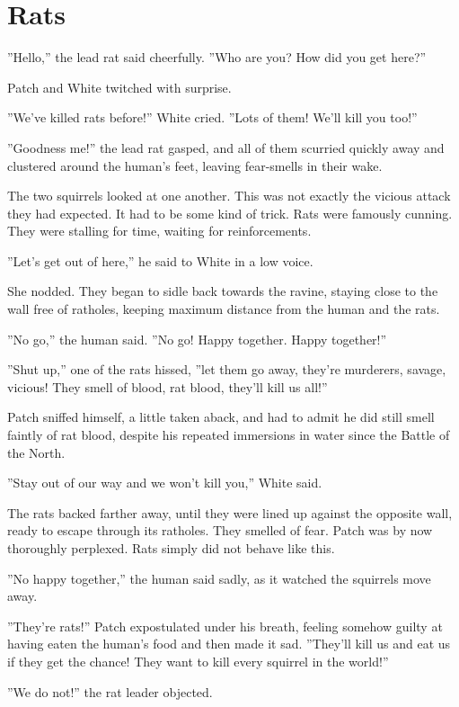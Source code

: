 \documentclass[12pt]{book}
\begin{document}

\section{Rats}

''Hello,'' the lead rat said cheerfully. ''Who are you? How did you get here?''

Patch and White twitched with surprise.

''We've killed rats before!'' White cried. ''Lots of them! We'll kill you too!''

''Goodness me!'' the lead rat gasped, and all of them scurried quickly away and clustered around the human's feet, leaving fear-smells in their wake.

The two squirrels looked at one another. This was not exactly the vicious attack they had expected. It had to be some kind of trick. Rats were famously cunning. They were stalling for time, waiting for reinforcements.

''Let's get out of here,'' he said to White in a low voice.

She nodded. They began to sidle back towards the ravine, staying close to the wall free of ratholes, keeping maximum distance from the human and the rats.

''No go,'' the human said. ''No go! Happy together. Happy together!''

''Shut up,'' one of the rats hissed, ''let them go away, they're murderers, savage, vicious! They smell of blood, rat blood, they'll kill us all!''

Patch sniffed himself, a little taken aback, and had to admit he did still smell faintly of rat blood, despite his repeated immersions in water since the Battle of the North.

''Stay out of our way and we won't kill you,'' White said.

The rats backed farther away, until they were lined up against the opposite wall, ready to escape through its ratholes. They smelled of fear. Patch was by now thoroughly perplexed. Rats simply did not behave like this.

''No happy together,'' the human said sadly, as it watched the squirrels move away.

''They're rats!'' Patch expostulated under his breath, feeling somehow guilty at having eaten the human's food and then made it sad. ''They'll kill us and eat us if they get the chance! They want to kill every squirrel in the world!''

''We do not!'' the rat leader objected.
\end{document}
